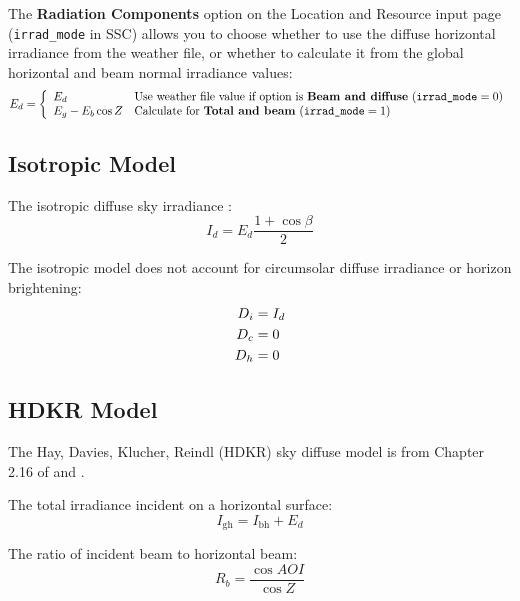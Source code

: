 \documentclass[12pt,letterpaper]{article}
\newcommand\AOI{\ensuremath{\mathit{AOI}}}
\begin{document}
The \textbf{Radiation Components} option on the Location and Resource input page (\texttt{irrad\_mode} in SSC) allows you to choose whether to use the diffuse horizontal irradiance from the weather file, or whether to calculate it from the global horizontal and beam normal irradiance values:
\begin{equation}\label{eqn-diffhoriz}
E_d = \left\{
\begin{array}{ll}
E_d & \text{Use weather file value if option is \textbf{Beam and diffuse} ($\texttt{irrad\_mode}=0)$}\\
E_g - E_b\cos Z & \text{Calculate for \textbf{Total and beam} ($\texttt{irrad\_mode}=1)$}
\end{array}
\right.
\end{equation}

\subsection{Isotropic Model}

The isotropic diffuse sky irradiance \citep{liu1963}:
\begin{equation}
I_d = E_d\frac{1 + \cos\beta}{2}
\end{equation}

The isotropic model does not account for circumsolar diffuse irradiance or horizon brightening:
\begin{align}
D_i &= I_d \notag\\
D_c &= 0 \notag\\
D_h &= 0
\end{align}

\subsection{HDKR Model}

The Hay, Davies, Klucher, Reindl (HDKR) sky diffuse model is from Chapter 2.16 of \citet{duffie2013} and \citet{reindl1988}.

The total irradiance incident on a horizontal surface:
\begin{equation}
I_{\mathrm{gh}} = I_{\mathrm{bh}} + E_d
\end{equation}

The ratio of incident beam to horizontal beam:
\begin{equation}
R_b = \frac{\cos\AOI}{\cos Z}
\end{equation}
\end{document}
